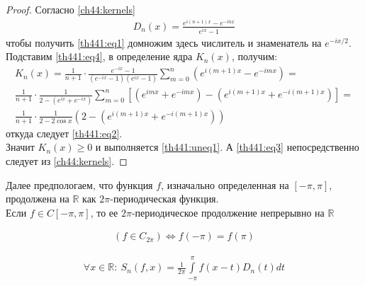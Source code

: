 \begin{proof}
  Согласно \eqref{ch44:kernels}
  \begin{gather}
    D_n(x) = \frac{e^{i(n+1)x} - e^{-inx}}{e^{ix} - 1}
    \label{th441:eq4}
  \end{gather}
  чтобы получить \eqref{th441:eq1} домножим здесь числитель и знаменатель на
  $e^{-ix/2}$. \\
  Подставим \eqref{th441:eq4}, в определение ядра $K_n(x)$, получим:
  \begin{gather*}
    K_n(x) = \frac{1}{n + 1} \cdot \frac{e^{-ix} - 1}{(e^{-ix} - 1)(e^{ix} - 1)}
    \sum\limits_{m = 0}^{n} (e^{i(m+1)x} - e^{-imx}) = \\ \frac{1}{n + 1} \cdot
    \frac{1}{2 - (e^{ix} + e^{-ix})} \sum\limits_{m = 0}^{n} [(e^{imx} +
    e^{-imx}) - (e^{i(m+1)x} + e^{-i(m+1)x})] = \\ \frac{1}{n + 1}
    \cdot \frac{1}{2 - 2
    \cos x} (2 - (e^{i(m+1)x} + e^{-i(m+1)x}))
  \end{gather*}
  откуда следует \eqref{th441:eq2}. \\
  Значит $K_n(x) \geq 0$ и выполняется \eqref{th441:uneq1}. А \eqref{th441:eq3}
  непосредственно следует из \eqref{ch44:kernels}.
\end{proof}

Далее предпологаем, что функция $f$, изначально определенная на $[-\pi, \pi]$,
продолжена на $\mathbb{R}$ как $2\pi$-периодическая функция. \\
Если $f \in C[-\pi, \pi]$, то ее $2\pi$-периодическое продолжение непрерывно на
$\mathbb{R}$

\begin{gather*}
  (f \in C_{2\pi}) \Longleftrightarrow f(-\pi) = f(\pi)
\end{gather*}

\begin{lemma}
  \begin{gather}
    \forall x \in \mathbb{R}: \ S_n(f, x) = \frac{1}{2\pi}
    \int\limits_{-\pi}^\pi f(x - t) D_n(t) dt
    \label{lem441:eq1}
  \end{gather}
\end{lemma}

